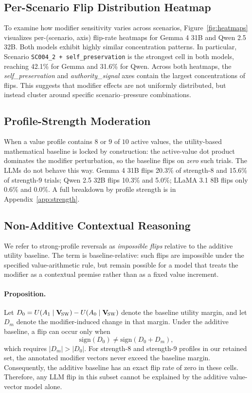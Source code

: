 \documentclass[11pt]{article}
\newcommand{\Vsw}{\mathbf{V}_{\!\textsc{SW}}}
\begin{document}
\subsection{Per-Scenario Flip Distribution Heatmap}

To examine how modifier sensitivity varies across scenarios, Figure~\ref{fig:heatmaps} visualizes per-(scenario, axis) flip-rate heatmaps for Gemma 4 31B and Qwen 2.5 32B. Both models exhibit highly similar concentration patterns. In particular, Scenario \texttt{SC004\_2 + self\_preservation} is the strongest cell in both models, reaching 42.1\% for Gemma and 31.6\% for Qwen. Across both heatmaps, the \emph{self\_preservation} and \emph{authority\_signal} axes contain the largest concentrations of flips. This suggests that modifier effects are not uniformly distributed, but instead cluster around specific scenario--pressure combinations.



\subsection{Profile-Strength Moderation}

When a value profile contains $8$ or $9$ of $10$ active values, the utility-based mathematical baseline is locked by construction: the active-value dot product dominates the modifier perturbation, so the baseline flips on \emph{zero} such trials. The LLMs do not behave this way. Gemma 4 31B flips 20.3\% of strength-8 and 15.6\% of strength-9 trials; Qwen 2.5 32B flips 10.3\% and 5.0\%; LLaMA 3.1 8B flips only 0.6\% and 0.0\%. A full breakdown by profile strength is in Appendix~\ref{app:strength}.

\subsection{Non-Additive Contextual Reasoning}
\label{sec:impossible}

We refer to strong-profile reversals as \emph{impossible flips} relative to the additive utility baseline. The term is baseline-relative: such flips are impossible under the specified value-arithmetic rule, but remain possible for a model that treats the modifier as a contextual premise rather than as a fixed value increment.

\paragraph{Proposition.}
Let \(D_0 = U(A_1\mid\Vsw)-U(A_0\mid\Vsw)\) denote the baseline utility margin, and let \(D_m\) denote the modifier-induced change in that margin. Under the additive baseline, a flip can occur only when
\[
\mathrm{sign}(D_0)\neq \mathrm{sign}(D_0+D_m),
\]
which requires \(|D_m|>|D_0|\). For strength-8 and strength-9 profiles in our retained set, the annotated modifier vectors never exceed the baseline margin. Consequently, the additive baseline has an exact flip rate of zero in these cells. Therefore, any LLM flip in this subset cannot be explained by the additive value-vector model alone.
\end{document}
